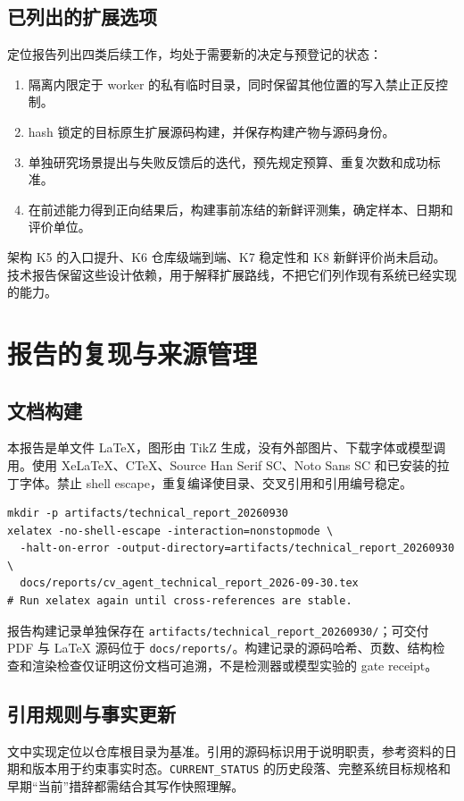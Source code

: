 \documentclass[UTF8,a4paper,zihao=-4,fontset=none]{ctexart}
\newcommand{\code}[1]{{\small\nolinkurl{#1}}}
\begin{document}
\subsection{已列出的扩展选项}
定位报告列出四类后续工作，均处于需要新的决定与预登记的状态：
\begin{enumerate}
\item 隔离内限定于 worker 的私有临时目录，同时保留其他位置的写入禁止正反控制。
\item hash 锁定的目标原生扩展源码构建，并保存构建产物与源码身份。
\item 单独研究场景提出与失败反馈后的迭代，预先规定预算、重复次数和成功标准。
\item 在前述能力得到正向结果后，构建事前冻结的新鲜评测集，确定样本、日期和评价单位。
\end{enumerate}
架构 K5 的入口提升、K6 仓库级端到端、K7 稳定性和 K8 新鲜评价尚未启动。技术报告保留这些设计依赖，用于解释扩展路线，不把它们列作现有系统已经实现的能力。\cite{positioning,architectureplan}

\section{报告的复现与来源管理}
\subsection{文档构建}
本报告是单文件 LaTeX，图形由 TikZ 生成，没有外部图片、下载字体或模型调用。使用 XeLaTeX、CTeX、Source Han Serif SC、Noto Sans SC 和已安装的拉丁字体。禁止 shell escape，重复编译使目录、交叉引用和引用编号稳定。

\begin{lstlisting}[caption={从项目根目录编译技术报告的命令。}]
mkdir -p artifacts/technical_report_20260930
xelatex -no-shell-escape -interaction=nonstopmode \
  -halt-on-error -output-directory=artifacts/technical_report_20260930 \
  docs/reports/cv_agent_technical_report_2026-09-30.tex
# Run xelatex again until cross-references are stable.
\end{lstlisting}

报告构建记录单独保存在 \code{artifacts/technical_report_20260930/}；可交付 PDF 与 LaTeX 源码位于 \code{docs/reports/}。构建记录的源码哈希、页数、结构检查和渲染检查仅证明这份文档可追溯，不是检测器或模型实验的 gate receipt。

\subsection{引用规则与事实更新}
文中实现定位以仓库根目录为基准。引用的源码标识用于说明职责，参考资料的日期和版本用于约束事实时态。\code{CURRENT_STATUS} 的历史段落、完整系统目标规格和早期“当前”措辞都需结合其写作快照理解。
\end{document}
